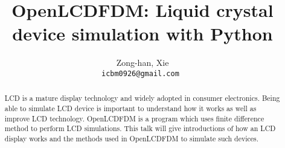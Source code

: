 \documentclass[11pt, a4paper]{article} %
\date{} %
\def\titulo#1{\title{#1}} %
\def\autores#1{\author{#1}} %
\begin{document}
\titulo{OpenLCDFDM: Liquid crystal device simulation with Python}

\autores{Zong-han, Xie \\
       \tt{icbm0926@gmail.com}
       }

\maketitle

\thispagestyle{empty}



\begin{abstract}
LCD is a mature display technology and widely adopted in consumer electronics. Being able to simulate LCD device is important to understand how it works as well as improve LCD technology. OpenLCDFDM is a program which uses finite difference method to perform LCD simulations. This talk will give introductions of how an LCD display works and the methods used in OpenLCDFDM to simulate such devices.
\end{abstract}
\end{document}
